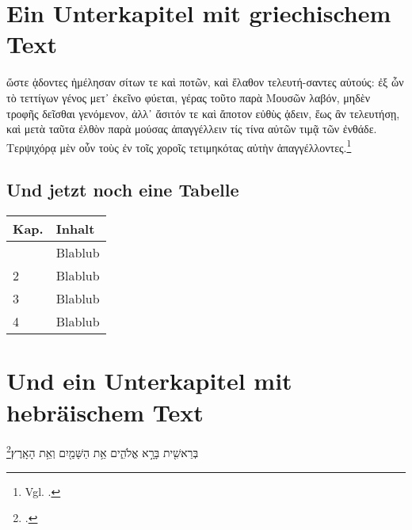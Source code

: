 \section{Ein Unterkapitel mit griechischem Text}
\textgreek{ὥστε ᾁδοντες ἠμέλησαν σίτων τε καὶ ποτῶν, καὶ ἔλαθον τελευτή-σαντες αὑτούς: ἐξ ὧν τὸ τεττίγων γένος μετ᾽ ἐκεῖνο φύεται, γέρας τοῦτο παρὰ Μουσῶν λαβόν, μηδὲν τροφῆς δεῖσθαι γενόμενον, ἀλλ᾽ ἄσιτόν τε καὶ ἄποτον εὐθὺς ᾁδειν, ἕως ἂν τελευτήσῃ, καὶ μετὰ ταῦτα ἐλθὸν παρὰ μούσας ἀπαγγέλλειν τίς τίνα αὐτῶν τιμᾷ τῶν ἐνθάδε. Τερψιχόρᾳ μὲν οὖν τοὺς ἐν τοῖς χοροῖς τετιμηκότας αὐτὴν ἀπαγγέλλοντες.}\footnote{Vgl. .}
 \subsection{Und jetzt noch eine Tabelle}
\begin{longtable}{p{}p{}} %
	\hline
	Kap. &  Inhalt \\
	\hline
	\endhead %
	\hline
	\endfoot %
	1 & Blablub \\ %
	2 & Blablub \\
	3 & Blablub \\		
	4 & Blablub \\
\end{longtable}
\section{Und ein Unterkapitel mit hebräischem Text}
\texthebrew{בְּרֵאשִׁ֖ית בָּרָ֣א אֱלֹהִ֑ים אֵ֥ת הַשָּׁמַ֖יִם וְאֵ֥ת הָאָֽרֶץ׃}\footnote{.}
